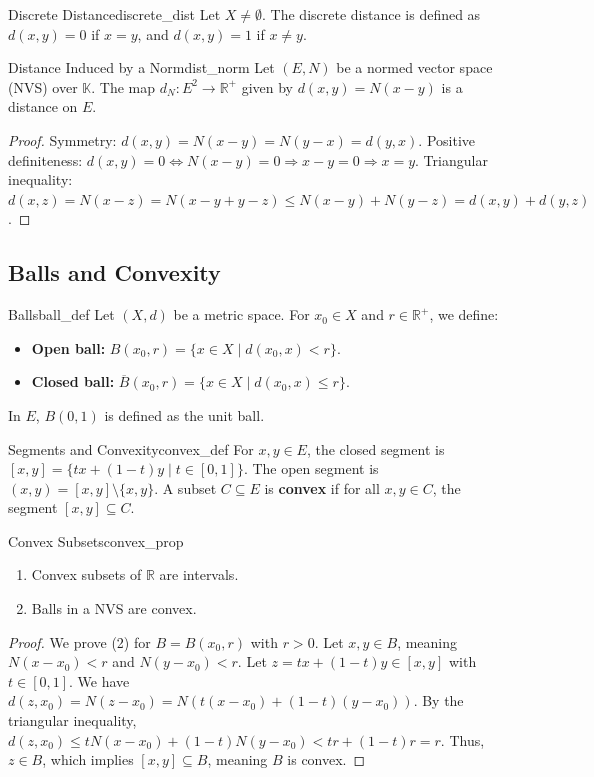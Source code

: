 \documentclass[11pt, a4paper]{article}
\begin{document}
\begin{example}{Discrete Distance}{discrete_dist}
Let $X \neq \emptyset$. The discrete distance is defined as $d(x,y) = 0$ if $x = y$, and $d(x,y) = 1$ if $x \neq y$.
\end{example}

\begin{proposition}{Distance Induced by a Norm}{dist_norm}
Let $(E, N)$ be a normed vector space (NVS) over $\mathbb{K}$. The map $d_N: E^2 \to \mathbb{R}^+$ given by $d(x,y) = N(x-y)$ is a distance on $E$.
\end{proposition}
\begin{proof}
Symmetry: $d(x,y) = N(x-y) = N(y-x) = d(y,x)$.
Positive definiteness: $d(x,y) = 0 \Leftrightarrow N(x-y) = 0 \Rightarrow x-y = 0 \Rightarrow x = y$.
Triangular inequality: $d(x,z) = N(x-z) = N(x-y+y-z) \le N(x-y) + N(y-z) = d(x,y) + d(y,z)$.
\end{proof}

\subsection{Balls and Convexity}
\begin{definition}{Balls}{ball_def}
Let $(X, d)$ be a metric space. For $x_0 \in X$ and $r \in \mathbb{R}^+$, we define:
\begin{itemize}
    \item \textbf{Open ball:} $B(x_0, r) = \{x \in X \mid d(x_0, x) < r\}$.
    \item \textbf{Closed ball:} $\overline{B}(x_0, r) = \{x \in X \mid d(x_0, x) \le r\}$.
\end{itemize}
In $E$, $B(0, 1)$ is defined as the unit ball.
\end{definition}

\begin{definition}{Segments and Convexity}{convex_def}
For $x, y \in E$, the closed segment is $[x,y] = \{tx + (1-t)y \mid t \in [0, 1]\}$. The open segment is $(x,y) = [x,y] \setminus \{x, y\}$.
A subset $C \subseteq E$ is \textbf{convex} if for all $x, y \in C$, the segment $[x,y] \subseteq C$.
\end{definition}

\begin{proposition}{Convex Subsets}{convex_prop}
\begin{enumerate}
    \item Convex subsets of $\mathbb{R}$ are intervals.
    \item Balls in a NVS are convex.
\end{enumerate}
\end{proposition}
\begin{proof}
We prove (2) for $B = B(x_0, r)$ with $r > 0$.
Let $x, y \in B$, meaning $N(x-x_0) < r$ and $N(y-x_0) < r$.
Let $z = tx + (1-t)y \in [x,y]$ with $t \in [0,1]$.
We have $d(z, x_0) = N(z-x_0) = N(t(x-x_0) + (1-t)(y-x_0))$.
By the triangular inequality, $d(z, x_0) \le tN(x-x_0) + (1-t)N(y-x_0) < tr + (1-t)r = r$.
Thus, $z \in B$, which implies $[x,y] \subseteq B$, meaning $B$ is convex.
\end{proof}
\end{document}
